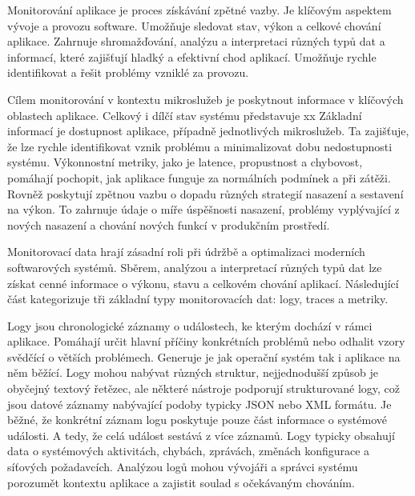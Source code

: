 


Monitorování aplikace je proces získávání zpětné vazby. Je klíčovým aspektem vývoje a provozu software. Umožňuje sledovat stav, výkon a celkové chování aplikace. Zahrnuje shromažďování, analýzu a interpretaci různých typů dat a informací, které zajišťují hladký a efektivní chod aplikací. Umožňuje rychle identifikovat a řešit problémy vzniklé za provozu. \cite{Riedesel2021}


Cílem monitorování v kontextu mikroslužeb je poskytnout informace v klíčových oblastech aplikace. Celkový i dílčí stav systému představuje xx Základní informací je dostupnost aplikace, případně jednotlivých mikroslužeb. Ta zajišťuje, že lze rychle identifikovat vznik problému a minimalizovat dobu nedostupnosti systému. Výkonnostní metriky, jako je latence, propustnost a chybovost, pomáhají pochopit, jak aplikace funguje za normálních podmínek a při zátěži. Rovněž poskytují zpětnou vazbu o dopadu různých strategií nasazení a sestavení na výkon. To zahrnuje údaje o míře úspěšnosti nasazení, problémy vyplývající z nových nasazení a chování nových funkcí v produkčním prostředí. \


Monitorovací data hrají zásadní roli při údržbě a optimalizaci moderních softwarových systémů. Sběrem, analýzou a interpretací různých typů dat lze získat cenné informace o výkonu, stavu a celkovém chování aplikací. Následující část kategorizuje tři základní typy monitorovacích dat: logy, traces a metriky. \cite{Majors2022}


Logy jsou chronologické záznamy o událostech, ke kterým dochází v rámci aplikace. Pomáhají určit hlavní příčiny konkrétních problémů nebo odhalit vzory svědčící o větších problémech. Generuje je jak operační systém tak i aplikace na něm běžící. Logy mohou nabývat různých struktur, nejjednodušší způsob je obyčejný textový řetězec, ale některé nástroje podporují strukturované logy, což jsou datové záznamy nabývající podoby typicky JSON nebo XML formátu. Je běžné, že konkrétní záznam logu poskytuje pouze část informace o systémové události. A tedy, že celá událost sestává z více záznamů. \cite{Majors2022} Logy typicky obsahují data o systémových aktivitách, chybách, zprávách, změnách konfigurace a síťových požadavcích. Analýzou logů mohou vývojáři a správci systému porozumět kontextu aplikace a zajistit soulad s očekávaným chováním. \cite{Majors2022}

